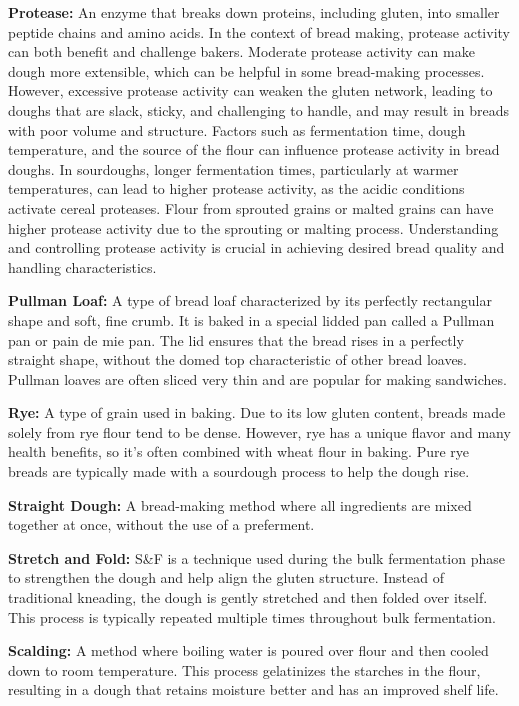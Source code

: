 \textbf{Protease:} An enzyme that breaks down proteins, including gluten, into smaller
peptide chains and amino acids. In the context of bread making, protease activity can
both benefit and challenge bakers. Moderate protease activity can make dough more
extensible, which can be helpful in some bread-making processes. However, excessive
protease activity can weaken the gluten network, leading to doughs that are slack,
sticky, and challenging to handle, and may result in breads with poor volume and
structure. Factors such as fermentation time, dough temperature, and the source of the
flour can influence protease activity in bread doughs. In sourdoughs, longer
fermentation times, particularly at warmer temperatures, can lead to higher protease
activity, as the acidic conditions activate cereal proteases. Flour from sprouted
grains or malted grains can have higher protease activity due to the sprouting or
malting process. Understanding and controlling protease activity is crucial in
achieving desired bread quality and handling characteristics.

\textbf{Pullman Loaf:} A type of bread loaf characterized by its perfectly rectangular
shape and soft, fine crumb. It is baked in a special lidded pan called a Pullman pan
or pain de mie pan. The lid ensures that the bread rises in a perfectly straight
shape, without the domed top characteristic of other bread loaves. Pullman loaves are
often sliced very thin and are popular for making sandwiches.

\textbf{Rye:} A type of grain used in baking. Due to its low gluten content, breads
made solely from rye flour tend to be dense. However, rye has a unique flavor and
many health benefits, so it's often combined with wheat flour in baking. Pure rye
breads are typically made with a sourdough process to help the dough rise.

\textbf{Straight Dough:} A bread-making method where all ingredients are mixed
together at once, without the use of a preferment.

\textbf{Stretch and Fold:} S\&F is a technique used during the bulk fermentation phase
to strengthen the dough and help align the gluten structure. Instead of traditional
kneading, the dough is gently stretched and then folded over itself. This process is
typically repeated multiple times throughout bulk fermentation.

\textbf{Scalding:} A method where boiling water is poured over flour and then cooled
down to room temperature. This process gelatinizes the starches in the flour,
resulting in a dough that retains moisture better and has an improved shelf life.

